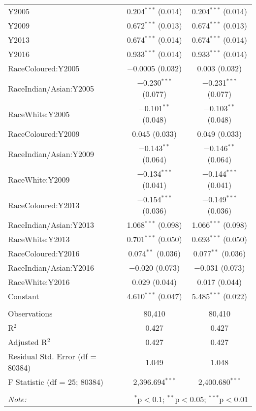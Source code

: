 \documentclass[11pt,preprint, authoryear]{elsarticle}
\let\origtable\table
\let\endorigtable\endtable
\renewenvironment{table}[1][2] {
    \expandafter\origtable\expandafter[H]
} {
    \endorigtable
}
\numberwithin{equation}{section}
\numberwithin{figure}{section}
\numberwithin{table}{section}
\begin{document}
\begin{table}[!htbp]
\begin{tabular}{@{\extracolsep{3pt}}lcc}
  Y2005 & 0.204$^{***}$ (0.014) & 0.204$^{***}$ (0.014) \\ 
  Y2009 & 0.672$^{***}$ (0.013) & 0.674$^{***}$ (0.013) \\ 
  Y2013 & 0.674$^{***}$ (0.014) & 0.674$^{***}$ (0.014) \\ 
  Y2016 & 0.933$^{***}$ (0.014) & 0.933$^{***}$ (0.014) \\ 
  RaceColoured:Y2005 & $-$0.0005 (0.032) & 0.003 (0.032) \\ 
  RaceIndian/Asian:Y2005 & $-$0.230$^{***}$ (0.077) & $-$0.231$^{***}$ (0.077) \\ 
  RaceWhite:Y2005 & $-$0.101$^{**}$ (0.048) & $-$0.103$^{**}$ (0.048) \\ 
  RaceColoured:Y2009 & 0.045 (0.033) & 0.049 (0.033) \\ 
  RaceIndian/Asian:Y2009 & $-$0.143$^{**}$ (0.064) & $-$0.146$^{**}$ (0.064) \\ 
  RaceWhite:Y2009 & $-$0.134$^{***}$ (0.041) & $-$0.144$^{***}$ (0.041) \\ 
  RaceColoured:Y2013 & $-$0.154$^{***}$ (0.036) & $-$0.149$^{***}$ (0.036) \\ 
  RaceIndian/Asian:Y2013 & 1.068$^{***}$ (0.098) & 1.066$^{***}$ (0.098) \\ 
  RaceWhite:Y2013 & 0.701$^{***}$ (0.050) & 0.693$^{***}$ (0.050) \\ 
  RaceColoured:Y2016 & 0.074$^{**}$ (0.036) & 0.077$^{**}$ (0.036) \\ 
  RaceIndian/Asian:Y2016 & $-$0.020 (0.073) & $-$0.031 (0.073) \\ 
  RaceWhite:Y2016 & 0.029 (0.044) & 0.017 (0.044) \\ 
  Constant & 4.610$^{***}$ (0.047) & 5.485$^{***}$ (0.022) \\ 
 \hline \\[-1.8ex] 
Observations & 80,410 & 80,410 \\ 
R$^{2}$ & 0.427 & 0.427 \\ 
Adjusted R$^{2}$ & 0.427 & 0.427 \\ 
Residual Std. Error (df = 80384) & 1.049 & 1.048 \\ 
F Statistic (df = 25; 80384) & 2,396.694$^{***}$ & 2,400.680$^{***}$ \\ 
\hline 
\hline \\[-1.8ex] 
\textit{Note:}  & \multicolumn{2}{r}{$^{*}$p$<$0.1; $^{**}$p$<$0.05; $^{***}$p$<$0.01} \\ 
\end{tabular} 
\end{table}
\end{document}

